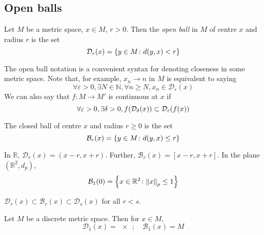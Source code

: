 \subsection{Open balls}
\begin{definition}
	Let \( M \) be a metric space, \( x \in M \), \( r > 0 \).
	Then the \textit{open ball} in \( M \) of centre \( x \) and radius \( r \) is the set
	\[
		\mathcal D_r(x) = \qty{y \in M \colon d(y,x) < r}
	\]
\end{definition}
The open ball notation is a convenient syntax for denoting closeness in some metric space.
Note that, for example, \( x_n \to n \) in \( M \) is equivalent to saying
\[
	\forall \varepsilon > 0, \exists N \in \mathbb N, \forall n \geq N, x_n \in \mathcal D_\varepsilon(x)
\]
We can also say that \( f \colon M \to M' \) is continuous at \( x \) if
\[
	\forall \varepsilon > 0, \exists \delta > 0, f\qty(\mathcal D_\delta(x)) \subset \mathcal D_\varepsilon(f(x))
\]
\begin{definition}
	The closed ball of centre \( x \) and radius \( r \geq 0 \) is the set
	\[
		\mathcal B_r(x) = \qty{y \in M \colon d(y,x) \leq r}
	\]
\end{definition}
\begin{example}
	In \( \mathbb R \), \( \mathcal D_r(x) = (x-r,x+r) \).
	Further, \( \mathcal B_r(x) = [x-r,x+r] \).
	In the plane \( (\mathbb R^2, d_p) \),
	\[
		\mathcal B_1(0) = \qty{ x \in \mathbb R^2 \colon \norm{x}_p \leq 1 }
	\]
\end{example}
\begin{note}
	\( \mathcal D_r(x) \subset \mathcal B_r(x) \subset \mathcal D_s(x) \) for all \( r < s \).
\end{note}
\begin{example}
	Let \( M \) be a discrete metric space.
	Then for \( x \in M \),
	\[
		\mathcal D_1(x) = \qty{x};\quad \mathcal B_1(x) = M
	\]
\end{example}


